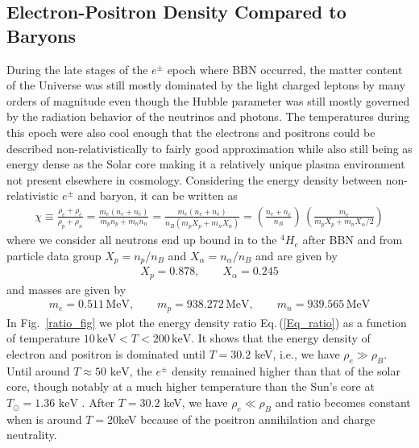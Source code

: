 \documentclass[universe,article,submit,moreauthors,pdftex,a4paper]{Definitions/mdpi}
\newcommand{\keV}{\text{ keV}}
\newcommand{\req}[1]{Eq.\,(\ref{#1})}
\newcommand*{\rf}[1]{Fig.~{\ref{#1}}}
\begin{document}
\subsection{Electron-Positron Density Compared to Baryons}\label{sec:ElectronPositronDensity}
\noindent During the late stages of the $e^{\pm}$ epoch where BBN occurred, the matter content of the Universe was still mostly dominated by the light charged leptons by many orders of magnitude even though the Hubble parameter was still mostly governed by the radiation behavior of the neutrinos and photons. The temperatures during this epoch were also cool enough that the electrons and positrons could be described non-relativistically to fairly good approximation while also still being as energy dense as the Solar core making it a relatively unique plasma environment not present elsewhere in cosmology. Considering the energy density between non-relativistic $e^{\pm}$ and baryon, it can be written as
\begin{align}\label{Eq_ratio}
\chi\equiv\frac{\rho_e+\rho_{\bar e}}{\rho_p+\rho_n}=\frac{m_e(n_e+n_{\bar e})}{m_pn_p+m_n n_n}=\frac{m_e(n_e+n_{\bar e})}{n_B(m_pX_p+m_nX_n)}=\left(\frac{n_e+n_{\bar e}}{n_B}\right)\,\left(\frac{m_e}{m_pX_p+{m_n X_\alpha}/2}\right)
\end{align}
where we consider all neutrons end up bound in to the $^4H_e$ after BBN  and from particle data group $X_p=n_p/n_B$ and $X_\alpha=n_\alpha/n_B$ and are given by
\begin{align}
X_p=0.878,\qquad X_\alpha=0.245
\end{align}
and masses are given by
\begin{align}
m_e=0.511\,\mathrm{MeV}, \qquad m_p=938.272\,\mathrm{MeV},\qquad m_n=939.565\,\mathrm{MeV}
\end{align}
In \rf{ratio_fig} we plot the energy density ratio \req{Eq_ratio} as a function of temperature $10\,\mathrm{keV}< T<200\,\mathrm{keV}$. It shows that the energy density of electron and positron is dominated until $T=30.2$ keV, i.e.,  we have $\rho_{e}\gg\rho_B$.  Until around $T\approx50\keV$, the $e^{\pm}$ density remained higher than that of the solar core, though notably at a much higher temperature than the Sun's core at $T_{\odot}=1.36\keV$ \cite{Castellani:1996cm}. After $T=30.2$ keV, we have $\rho_{e}\ll\rho_B$ and ratio becomes constant when is around $T=20$keV because of the positron annihilation and charge neutrality.
\end{document}
